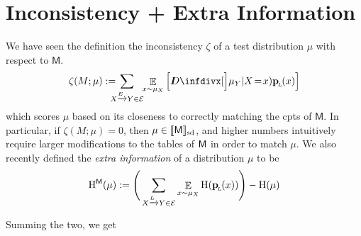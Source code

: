 \documentclass{article}
\newcommand{\bp}[1][L]{\mat{p}_{\!_#1\!}}
\newcommand{\Ed}{\mathcal E}
\newcommand{\sfM}{\mathsf M}
\newcommand\SD{_{\text{sd}}}
\begin{document}
	
	\section{Inconsistency + Extra Information}
			
		We have seen the definition the inconsistency $\zeta$ of a test distribution $\mu$ with respect to $\sfM$.
		\[
			\zeta(M ; \mu) := %
			\!\!\!\!\!\sum_{ X \xrightarrow{\!\!E} Y  \in \Ed }\!\! \mathop{\mathbb E}_{x \sim \mu_X} \left[\kldiv[\Big]{ \mu_Y | X \!=\! x) }{\bp(x) } \right]
		\] 
		which scores $\mu$ based on its closeness to correctly matching the cpts of $\sfM$. In particular, if $\zeta(M;\mu) = 0$, then $\mu \in \bbr{\sfM}\SD$, and higher numbers intuitively require larger modifications to the tables of $\sf M$ in order to match $\mu$.     
		We also recently defined the \emph{extra information} of a distribution $\mu$ to be
		\[ \H^{\sfM}(\mu) := \Bigg(\sum_{ X \xrightarrow{\!\!L} Y  \in \Ed } \E_{x \sim \mu_X}  \H (\bp (x)) \Bigg) - \H(\mu) \] 
		
		Summing the two, we get 
	
\end{document}
